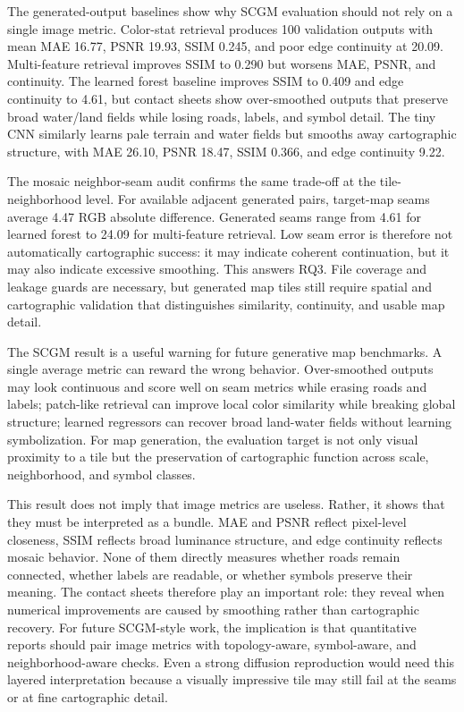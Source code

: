 \documentclass[]{interact}
\begin{document}
The generated-output baselines show why SCGM evaluation should not rely on a single image metric. Color-stat retrieval produces 100 validation outputs with mean MAE 16.77, PSNR 19.93, SSIM 0.245, and poor edge continuity at 20.09. Multi-feature retrieval improves SSIM to 0.290 but worsens MAE, PSNR, and continuity. The learned forest baseline improves SSIM to 0.409 and edge continuity to 4.61, but contact sheets show over-smoothed outputs that preserve broad water/land fields while losing roads, labels, and symbol detail. The tiny CNN similarly learns pale terrain and water fields but smooths away cartographic structure, with MAE 26.10, PSNR 18.47, SSIM 0.366, and edge continuity 9.22.

The mosaic neighbor-seam audit confirms the same trade-off at the tile-neighborhood level. For available adjacent generated pairs, target-map seams average 4.47 RGB absolute difference. Generated seams range from 4.61 for learned forest to 24.09 for multi-feature retrieval. Low seam error is therefore not automatically cartographic success: it may indicate coherent continuation, but it may also indicate excessive smoothing. This answers RQ3. File coverage and leakage guards are necessary, but generated map tiles still require spatial and cartographic validation that distinguishes similarity, continuity, and usable map detail.

The SCGM result is a useful warning for future generative map benchmarks. A single average metric can reward the wrong behavior. Over-smoothed outputs may look continuous and score well on seam metrics while erasing roads and labels; patch-like retrieval can improve local color similarity while breaking global structure; learned regressors can recover broad land-water fields without learning symbolization. For map generation, the evaluation target is not only visual proximity to a tile but the preservation of cartographic function across scale, neighborhood, and symbol classes.

This result does not imply that image metrics are useless. Rather, it shows that they must be interpreted as a bundle. MAE and PSNR reflect pixel-level closeness, SSIM reflects broad luminance structure, and edge continuity reflects mosaic behavior. None of them directly measures whether roads remain connected, whether labels are readable, or whether symbols preserve their meaning. The contact sheets therefore play an important role: they reveal when numerical improvements are caused by smoothing rather than cartographic recovery. For future SCGM-style work, the implication is that quantitative reports should pair image metrics with topology-aware, symbol-aware, and neighborhood-aware checks. Even a strong diffusion reproduction would need this layered interpretation because a visually impressive tile may still fail at the seams or at fine cartographic detail.
\end{document}
